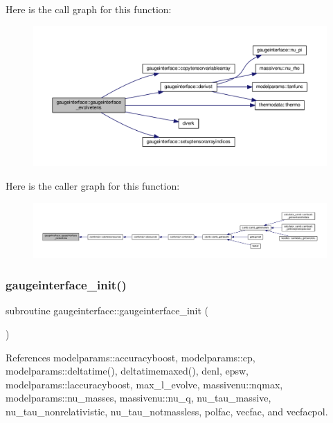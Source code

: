 Here is the call graph for this function\+:
\nopagebreak
\begin{figure}[H]
\begin{center}
\leavevmode
\includegraphics[width=350pt]{namespacegaugeinterface_a048447959e15ae6dd9e887a61e135d0c_cgraph}
\end{center}
\end{figure}
Here is the caller graph for this function\+:
\nopagebreak
\begin{figure}[H]
\begin{center}
\leavevmode
\includegraphics[width=350pt]{namespacegaugeinterface_a048447959e15ae6dd9e887a61e135d0c_icgraph}
\end{center}
\end{figure}
\mbox{\label{namespacegaugeinterface_a59182efb978c657918dd88675b2ab0ef}} 
\subsubsection{\texorpdfstring{gaugeinterface\+\_\+init()}{gaugeinterface\_init()}}
{\footnotesize\ttfamily subroutine gaugeinterface\+::gaugeinterface\+\_\+init (\begin{DoxyParamCaption}{ }\end{DoxyParamCaption})}



References modelparams\+::accuracyboost, modelparams\+::cp, modelparams\+::deltatime(), deltatimemaxed(), denl, epsw, modelparams\+::laccuracyboost, max\+\_\+l\+\_\+evolve, massivenu\+::nqmax, modelparams\+::nu\+\_\+masses, massivenu\+::nu\+\_\+q, nu\+\_\+tau\+\_\+massive, nu\+\_\+tau\+\_\+nonrelativistic, nu\+\_\+tau\+\_\+notmassless, polfac, vecfac, and vecfacpol.



